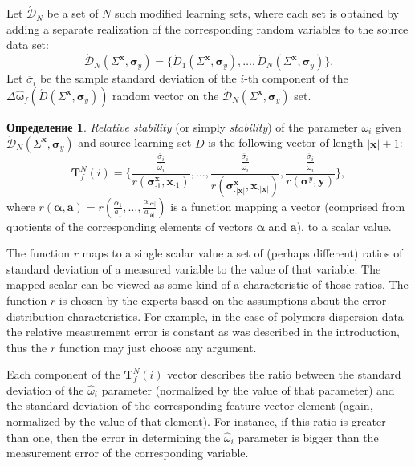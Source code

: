 \documentclass[11pt,a4paper]{article}
\theoremstyle{definition}
\newtheorem{defin}{Определение}
\begin{document}
Let $\acute{\mathcal{D}}_N$ be a set of $N$ such modified learning sets, where each
set is obtained by adding a separate realization of the corresponding random variables
to the source data set:
\[
  \acute{\mathcal{D}}_N (\Sigma^{\mathbf{x}}, \boldsymbol{\sigma}_y) = \{ \acute{D}_1 (\Sigma^{\mathbf{x}}, \boldsymbol{\sigma}_y), \dots, \acute{D}_N (\Sigma^{\mathbf{x}}, \boldsymbol{\sigma}_y) \}.
\]
Let $\overline{\sigma}_i$ be the sample standard deviation of the $i$-th component of the
$\Delta\hat{\boldsymbol{\omega}}_f(\acute{D} (\Sigma^{\mathbf{x}}, \boldsymbol{\sigma}_y) )$
random vector on the $\acute{\mathcal{D}}_N (\Sigma^{\mathbf{x}}, \boldsymbol{\sigma}_y)$ set.
\begin{defin}
\emph{Relative stability} (or simply \emph{stability}) of the parameter
$\omega_i$ given $\acute{\mathcal{D}}_N (\Sigma^{\mathbf{x}}, \boldsymbol{\sigma}_y)$
and source learning set $D$ is the following vector of length $| \mathbf{x} | + 1$:
\begin{equation}
  \mathbf{T}^N_f(i) = \Big\{ \frac{\frac{\overline{\sigma}_i}{\hat{\omega}_i}}{r(\boldsymbol{\sigma}^\mathbf{x}_{\cdot 1}, \mathbf{x}_{\cdot 1})}, \dots, \frac{\frac{\overline{\sigma}_i}{\hat{\omega}_i}}{r(\boldsymbol{\sigma}^\mathbf{x}_{\cdot |\mathbf{x}|}, \mathbf{x}_{\cdot |\mathbf{x}|})}, \frac{\frac{\overline{\sigma}_i}{\hat{\omega}_i}}{r(\boldsymbol{\sigma}^y, \mathbf{y})} \Big\},
  \label{eq:t_rel}
\end{equation}
where $r(\boldsymbol{\alpha}, \mathbf{a}) = r(\frac{\alpha_1}{a_1}, \dots, \frac{\alpha_{|\boldsymbol{\alpha}|}}{a_{|\mathbf{a}|}})$ is
a function mapping a vector (comprised from quotients of the corresponding elements of vectors $\boldsymbol{\alpha}$ and $\mathbf{a}$),
to a scalar value.
\end{defin}

The function $r$ maps to a single scalar value a set of (perhaps different) ratios of standard
deviation of a measured variable to the value of that variable. The mapped scalar can be
viewed as some kind of a characteristic of those ratios. The function $r$ is chosen by the
experts based on the assumptions about the error distribution characteristics. For example,
in the case of polymers dispersion data the relative measurement error is constant as was
described in the introduction, thus the $r$ function may just choose any argument.

Each component of the $\mathbf{T}^N_f(i)$ vector describes the ratio between the standard deviation
of the $\hat{\omega}_i$ parameter (normalized by the value of that parameter) and the standard
deviation of the corresponding feature vector element (again, normalized by the value of that element).
For instance, if this ratio is greater than one, then the error in determining the $\hat{\omega}_i$
parameter is bigger than the measurement error of the corresponding variable.
\end{document}
